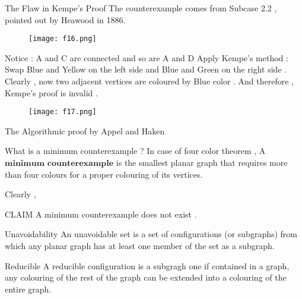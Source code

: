 \documentclass[12pt]{beamer}
\begin{document}
\begin{frame}{The Flaw in Kempe's Proof}
The counterexample comes from Subcase 2.2 , pointed out by Heawood in 1886.
\begin{figure}
\texttt{[image: f16.png]}
\end{figure}
\end{frame}

\begin{frame}

Notice : A and C are connected and so are A and D
Apply Kempe's method : Swap Blue and Yellow on the left side and Blue and Green on the right side .\\
Clearly , now two adjacent vertices are coloured by Blue color . And therefore , Kempe's proof is invalid .
\end{frame}

\begin{frame}
\begin{figure}
\texttt{[image: f17.png]}
\end{figure}

\end{frame}

\begin{frame}{The Algorithmic proof by Appel and Haken}
\begin{block}{What is a minimum counterexample ?}
In case of four color theorem , A $\mathbf{minimum}$ $\mathbf{counterexample}$ is the smallest planar graph that requires more than four colours for a proper colouring of its vertices.
\end{block}
Clearly ,\\
\begin{block}{CLAIM}
\Large{A minimum counterexample does not exist .}
\end{block}
\end{frame}

\begin{frame}
\begin{block}{Unavoidability}
An unavoidable set is a set of configurations (or subgraphs) from which any planar graph has at least one member of the set as a subgraph.
\end{block}
\begin{block}{Reducible}
A reducible configuration is a subgragh one if contained in a graph, any
colouring of the rest of the graph can be extended into a colouring of the entire graph.
\end{block}
\end{frame}
\end{document}
